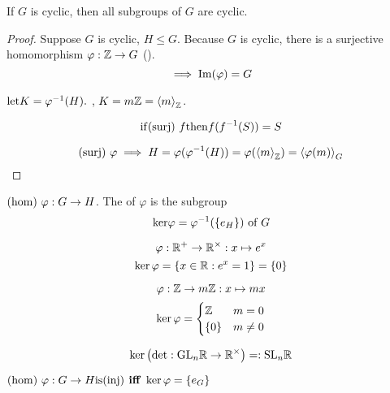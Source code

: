 \documentclass[12pt]{article}
\newcommand\im{\TR{Im}}
\newcommand\subgroup{\le}
\newcommand\vphi{\varphi}
\begin{document}
\bboxprop
\begin{prop}
    If \(G\) is cyclic, then all subgroups of \(G\)
    are cyclic.
\end{prop}
\ebox

\bboxproof
\begin{proof}
    Suppose \(G\) is cyclic, \(H\subgroup G\).
    Because \(G\) is cyclic, there is a surjective
    homomorphism \(\vphi:\Z\to G\) ().
    \[
        \implies \im(\vphi) = G
    \]

    \(\llet K=\vphi^{-1}(H).\) , 
    \(K=m\mathbb Z=\left\langle m\right\rangle_\mathbb Z\).
    \bboxnote
    \begin{note}
        \[
            \mathrm{if}(\mathrm{surj})\ f
            \mathrm{then} f(f^{-1}(S))=S
        \]
    \end{note}
    \ebox
    \[
        \TM{surj}\ \vphi\implies
        H=\vphi(\vphi^{-1}(H))
         =\vphi(\gen{m}_\Z)
         =\gen{\vphi(m)}_G
    \]
\end{proof}
\ebox

\bboxdefn
\begin{defn}[Kernel]
    \(\TM{hom}\ \vphi:G\to H\). The  of
    \(\vphi\) is the subgroup
    \[
        \TR{ker}\vphi=\vphi^{-1}(\{e_H\})\T{ of }G
    \]
\end{defn}
\ebox

\bboxexam
\begin{exam}
    \[
        \vphi:\R^+\to\R^\times:x\mapsto e^x
    \]
    \[
        \ker\vphi=\{x\in\R:e^x=1\}
                 =\{     0      \}
    \]
\end{exam}
\ebox


\bboxexam
\begin{exam}
    \[
        \vphi:\Z\to m\Z:x\mapsto mx
    \]
    \[
        \ker\vphi=
        \begin{cases}
            \Z    & m =    0 \\
            \{0\} & m \neq 0
        \end{cases}
    \]
\end{exam}
\ebox

\bboxexam
\begin{exam}
    \[
        \ker\left(
            \det : \mathrm{GL}_n\mathbb R \to \mathbb R^\times
        \right) =: \mathrm{SL}_n\mathbb R
    \]
\end{exam}
\ebox

\bboxprop
\begin{prop}
    \(\TM{hom}\ \vphi:G\to H\is\TM{inj}
    \TB{ iff }\ker\vphi=\{e_G\}\)
\end{prop}
\ebox
\end{document}

